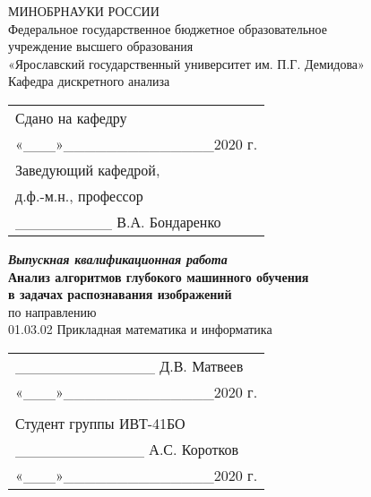 \begin{titlepage}
  \begin{center}  
    МИНОБРНАУКИ   РОССИИ\\  
    Федеральное государственное бюджетное образовательное\\
    учреждение высшего образования\\  
    «Ярославский государственный университет им. П.Г. Демидова»\\  
    \vspace{1em}
    Кафедра дискретного анализа
  \end{center}
  \vspace{1em}
  \null\hfill\begin{tabular}{l@{}}
    Сдано на кафедру\\
    «\_\_\_»\_\_\_\_\_\_\_\_\_\_\_\_\_\_2020 г.\\
    Заведующий кафедрой,\\
    д.ф.-м.н., профессор\\
    \_\_\_\_\_\_\_\_\_ В.А. Бондаренко\\
  \end{tabular}
  \vspace{2em}
  \begin{center}
    \textbf{\textit{Выпускная квалификационная работа}}\\    
    \vspace{1em}
    \textbf{Анализ алгоритмов глубокого машинного обучения \\ в задачах распознавания изображений}\\
    \vspace{1em}
    по направлению \\ 01.03.02 Прикладная математика и информатика\\
  \end{center}
  \vspace{1em}
  \null\hfill\begin{tabular}{l@{}}
    \_\_\_\_\_\_\_\_\_\_\_\_\_ Д.В. Матвеев\\
    «\_\_\_»\_\_\_\_\_\_\_\_\_\_\_\_\_\_2020 г.\\
  \vspace{1em}\\
    Студент группы ИВТ-41БО\\
    \_\_\_\_\_\_\_\_\_\_\_\_ А.С. Коротков\\
    «\_\_\_»\_\_\_\_\_\_\_\_\_\_\_\_\_\_2020 г.\\
  \end{tabular}
  \vfill
\end{titlepage}
\clearpage